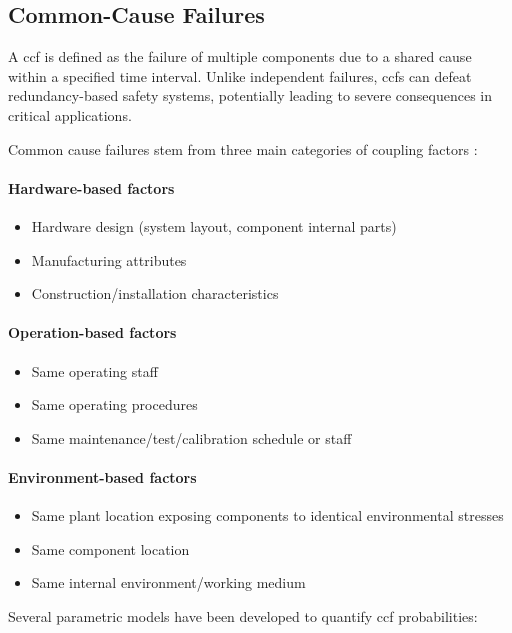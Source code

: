 \subsection{Common-Cause Failures}

A \acrfull{ccf} is defined as the failure of multiple components due to a shared cause within a specified time interval. Unlike independent failures, \acrshort{ccf}s can defeat redundancy-based safety systems, potentially leading to severe consequences in critical applications.

Common cause failures stem from three main categories of coupling factors \cite{NUREG5485}:

\paragraph{Hardware-based factors}
\begin{itemize}
    \item Hardware design (system layout, component internal parts)
    \item Manufacturing attributes
    \item Construction/installation characteristics
\end{itemize}

\paragraph{Operation-based factors}
\begin{itemize}
    \item Same operating staff
    \item Same operating procedures
    \item Same maintenance/test/calibration schedule or staff
\end{itemize}

\paragraph{Environment-based factors}
\begin{itemize}
    \item Same plant location exposing components to identical environmental stresses
    \item Same component location
    \item Same internal environment/working medium
\end{itemize}

Several parametric models have been developed to quantify \acrshort{ccf} probabilities:

